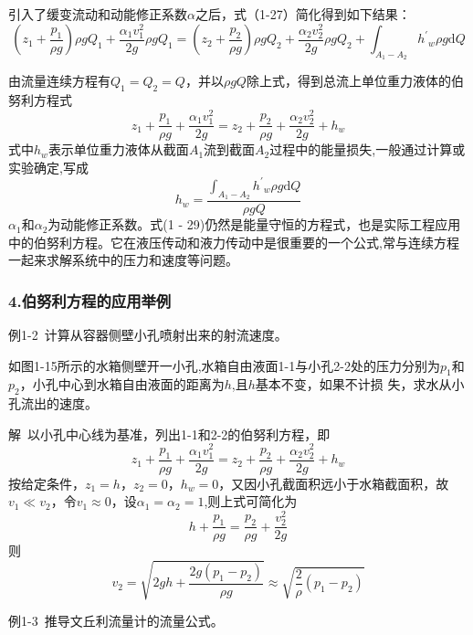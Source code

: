 引入了缓变流动和动能修正系数$\alpha$之后，式（1-27）简化得到如下结果：
\begin{equation*}
(z_1+\frac{p_1}{\rho g})\rho gQ_1+\frac{\alpha_1v_1^2}{2g}\rho gQ_1=(z_2+\frac{p_2}{\rho g})\rho gQ_2+\frac{\alpha_2v_2^2}{2g}\rho gQ_2+\int_{A_1-A_2} {h^{'}}_w{\rho} g \mathrm{d}Q
\end{equation*}

由流量连续方程有$Q_1=Q_2=Q$，并以$\rho gQ$除上式，得到总流上单位重力液体的伯努利方程式
\begin{equation}
z_1+\frac{p_1}{\rho g}+\frac{\alpha_1v_1^2}{2g}=z_2+\frac{p_2}{\rho g}+\frac{\alpha_2v_2^2}{2g}+h_w
\end{equation}
式中$h_w$表示单位重力液体从截面$A_1$流到截面$A_2$过程中的能量损失,一般通过计算或实验确定,写成
\begin{equation}
h_w=\frac{\int_{A_1-A_2} {h^{'}}_w{\rho} g \mathrm{d}Q}{\rho gQ}
\end{equation}
$\alpha_1$和$\alpha_2$为动能修正系数。式(1 - 29)仍然是能量守恒的方程式，也是实际工程应用中的伯努利方程。它在液压传动和液力传动中是很重要的一个公式,常与连续方程一起来求解系统中的压力和速度等问题。

\subsubsection*{4.伯努利方程的应用举例}

例1-2\ 计算从容器侧壁小孔喷射出来的射流速度。

如图1-15所示的水箱侧壁开一小孔,水箱自由液面1-1与小孔2-2处的压力分别为$p_1$和$p_2$，小孔中心到水箱自由液面的距离为$h$,且$h$基本不变，如果不计损
失，求水从小孔流出的速度。

解\ 以小孔中心线为基准，列出1-1和2-2的伯努利方程，即
\begin{equation*}
z_1+\frac{p_1}{\rho g}+\frac{\alpha_1v_1^2}{2g}=z_2+\frac{p_2}{\rho g}+\frac{\alpha_2v_2^2}{2g}+h_w
\end{equation*}
按给定条件，$z_1=h$，$z_2=0$，$h_w=0$，又因小孔截面积远小于水箱截面积，故$v_1\ll v_2$，令$v_1\approx 0$，设$\alpha_1=\alpha_2=1$,则上式可简化为
\begin{equation*}
    h+\frac{p_1}{\rho g}=\frac{p_2}{\rho g}+\frac{v_2^2}{2g}
\end{equation*}
则
\begin{equation*}
  v_2=\sqrt{2gh+\frac{2g(p_1-p_2)}{\rho g}}\approx \sqrt{\frac{2}{\rho}(p_1-p_2)}
\end{equation*}

例1-3\ 推导文丘利流量计的流量公式。

